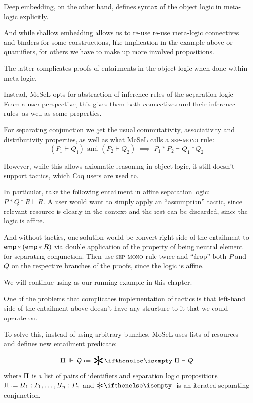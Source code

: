 Deep embedding, on the other hand, defines syntax of the object logic in meta-logic explicitly.

And while shallow embedding allows us to re-use re-use meta-logic connectives and binders for some constructions, like implication in the example above or quantifiers, for others we have to make up more involved propositions.

The latter complicates proofs of entailments in the object logic when done within meta-logic.

Instead, MoSeL opts for abstraction of inference rules of the separation logic.
From a user perspective, this gives them both connectives and their inference rules, as well as some properties.

For separating conjunction we get the usual commutativity, associativity and distributivity properties, as well as what MoSeL calls a \textsc{sep-mono} rule:
\[(P_1 \vdash Q_1) \text{ and } (P_2 \vdash Q_2) \,\, \implies \,\, P_1 * P_2 \vdash Q_1 * Q_2\]

However, while this allows axiomatic reasoning in object-logic, it still doesn't support tactics, which Coq users are used to.

In particular, take the following entailment in affine separation logic:
\(P * Q * R \vdash R\).
A user would want to simply apply an ``assumption'' tactic, since relevant resource is clearly in the context and the rest can be discarded, since the logic is affine.

And without tactics, one solution would be convert right side of the entailment to \(\textsf{emp} * (\textsf{emp} * R)\) via double application of the property of \emp being neutral element for separating conjunction.
Then use \textsc{sep-mono} rule twice and ``drop'' both \(P\) and \(Q\) on the respective branches of the proofs, since the logic is affine.

We will continue using  as our running example in this chapter.

One of the problems that complicates implementation of tactics is that left-hand side of the entailment above doesn't have any structure to it that we could operate on.

To solve this, instead of using arbitrary bunches, MoSeL uses lists of resources and defines new entailment predicate:

\[\entailsOneD Q \defeq \Sep \Pi \vdash Q\]
where \(\Pi\) is a list of pairs of identifiers and separation logic propositions \(\SpatD \defeq H_1 : P_1, \ldots , H_n : P_n\) and \(\Sep\) is an iterated separating conjunction.

